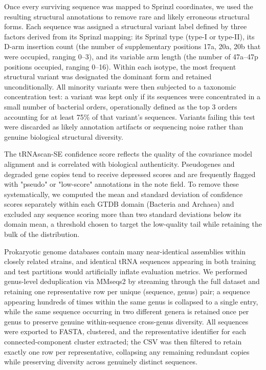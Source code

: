 \documentclass{article}
\begin{document}
Once every surviving sequence was mapped to Sprinzl coordinates, we used the resulting structural annotations to remove rare and likely erroneous structural forms. Each sequence was assigned a structural variant label defined by three factors derived from its Sprinzl mapping: its Sprinzl type (type-I or type-II), its D-arm insertion count (the number of supplementary positions 17a, 20a, 20b that were occupied, ranging 0–3), and its variable arm length (the number of 47a–47p positions occupied, ranging 0–16). Within each isotype, the most frequent structural variant was designated the dominant form and retained unconditionally. All minority variants were then subjected to a taxonomic concentration test: a variant was kept only if its sequences were concentrated in a small number of bacterial orders, operationally defined as the top 3 orders accounting for at least 75\% of that variant's sequences. Variants failing this test were discarded as likely annotation artifacts or sequencing noise rather than genuine biological structural diversity.

The tRNAscan-SE confidence score reflects the quality of the covariance model alignment and is correlated with biological authenticity. Pseudogenes and degraded gene copies tend to receive depressed scores and are frequently flagged with "pseudo" or "low-score" annotations in the note field. To remove these systematically, we computed the mean and standard deviation of confidence scores separately within each GTDB domain (Bacteria and Archaea) and excluded any sequence scoring more than two standard deviations below its domain mean, a threshold chosen to target the low-quality tail while retaining the bulk of the distribution.

Prokaryotic genome databases contain many near-identical assemblies within closely related strains, and identical tRNA sequences appearing in both training and test partitions would artificially inflate evaluation metrics. We performed genus-level deduplication via MMseqs2 by streaming through the full dataset and retaining one representative row per unique (sequence, genus) pair; a sequence appearing hundreds of times within the same genus is collapsed to a single entry, while the same sequence occurring in two different genera is retained once per genus to preserve genuine within-sequence cross-genus diversity. All sequences were exported to FASTA, clustered, and the representative identifier for each connected-component cluster extracted; the CSV was then filtered to retain exactly one row per representative, collapsing any remaining redundant copies while preserving diversity across genuinely distinct sequences.
\end{document}
